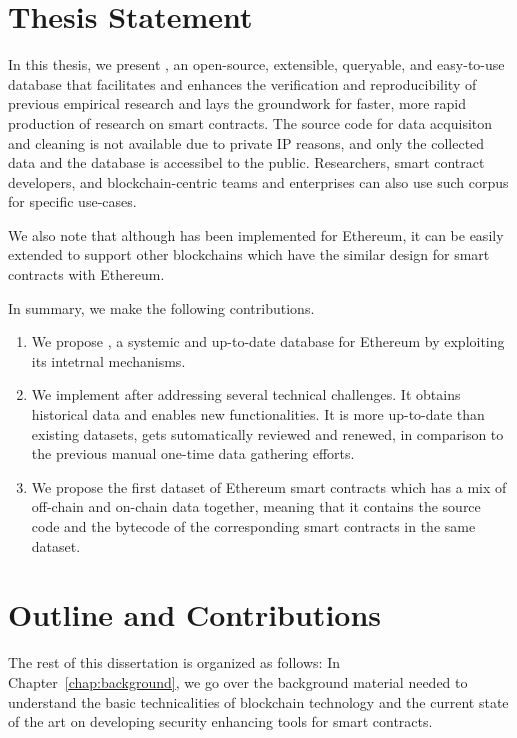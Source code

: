 \section{Thesis Statement}
  In this thesis, we present \etherbase, an open-source, extensible, queryable, and easy-to-use database that facilitates and enhances the verification and reproducibility of previous empirical research and lays the groundwork for faster, more rapid production of research on smart contracts.
  The source code for data acquisiton and cleaning is not available due to private IP reasons, and only the collected data and the database is accessibel to the public.
  Researchers, smart contract developers, and blockchain-centric teams and enterprises can also use such corpus for specific use-cases.

  We also note that although \etherbase has been implemented for Ethereum, it can be easily extended to support other blockchains which have the similar design for smart contracts with Ethereum.

  In summary, we make the following contributions.
  \begin{enumerate}
    \item We propose \etherbase, a systemic and up-to-date database for Ethereum by exploiting its intetrnal mechanisms.
    \item We implement \etherbase after addressing several technical challenges. It obtains historical data and enables new functionalities. It is more up-to-date than existing datasets, gets sutomatically reviewed and renewed, in comparison to the previous manual one-time data gathering efforts.
    \item We propose the first dataset of Ethereum smart contracts which has a mix of off-chain and on-chain data together, meaning that it contains the source code and the bytecode of the corresponding smart contracts in the same dataset.
  \end{enumerate}


\section{Outline and Contributions}

  The rest of this dissertation is organized as follows:
  In Chapter~\ref{chap:background}, we go over the background material needed to understand the basic technicalities of blockchain technology and the current state of the art on developing security enhancing tools for smart contracts.

